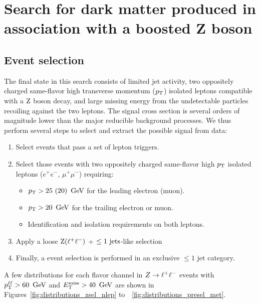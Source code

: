\chapter{Search for dark matter produced in association with a boosted Z boson}
\label{chap:zlldm}
\section{Event selection}
The final state in this search consists of limited jet activity, 
two oppositely charged same-flavor high transverse momentum ($p_{\mathrm{T}}$) isolated leptons
compatible with a $\mathrm{Z}$ boson decay, and large missing energy from the undetectable
particles recoiling against the two leptons.
The signal cross section is several orders of magnitude lower than the major reducible
background processes. We thus perform several steps to select and extract the
possible signal from data:
\begin{enumerate}
  \setlength\itemsep{0em}
    \item Select events that pass a set of lepton triggers.
    \item Select those events with two oppositely charged same-flavor high
    $p_{\mathrm{T}}$ isolated leptons ($e^+ e^-$, $\mu^+ \mu^-$) requiring:
      \begin{itemize}
          \setlength\itemsep{0em}
    	  \item $p_{\mathrm{T}}>25\ (20)~\,\text{Ge\hspace{-.08em}V}$ for the leading electron (muon).
    	  \item $p_{\mathrm{T}}>20~\,\text{Ge\hspace{-.08em}V}$ for the trailing electron or muon.
    	  \item Identification and isolation requirements
    	  on both leptons.
      \end{itemize}
    \item Apply a loose $\mathrm{Z}(\ell^+\ell^-)$ + $\leq 1~{\rm jets}$-like selection
    \item Finally, a event selection is performed in an exclusive $\leq 1$ jet category.
\end{enumerate}
A few distributions for each flavor channel in $Z\to\ell^+\ell^-$ events with 
$p_{\mathrm{T}}^{\ell\ell} > 60~\,\text{Ge\hspace{-.08em}V}$ and $E_\mathrm{T}^{\mathrm{miss}} > 40~\,\text{Ge\hspace{-.08em}V}$ are shown in 
Figures~\ref{fig:distributions_zsel_nlep} to~~\ref{fig:distributions_presel_met}.

